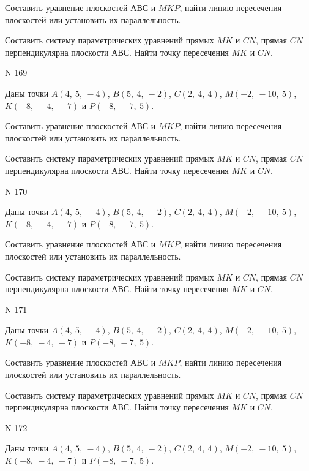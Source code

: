\documentclass[11pt]{report}
\begin{document}
Составить уравнение плоскостей $АВС$ и $MKP$,
найти линию пересечения плоскостей или установить их параллельность.

Составить систему параметрических уравнений прямых $MK$ и $CN$,
прямая $CN$ перпендикулярна плоскости $АВС$. 
Найти точку пересечения $MK$ и $CN$.



 N 169

Даны точки $A\left( 4, \  5, \  -4\right)$, $B\left( 5, \  4, \  -2\right)$, $C\left( 2, \  4, \  4\right)$, $M\left( -2, \  -10, \  5\right)$, $K\left( -8, \  -4, \  -7\right)$ и $P\left( -8, \  -7, \  5\right)$.


Составить уравнение плоскостей $АВС$ и $MKP$,
найти линию пересечения плоскостей или установить их параллельность.

Составить систему параметрических уравнений прямых $MK$ и $CN$,
прямая $CN$ перпендикулярна плоскости $АВС$. 
Найти точку пересечения $MK$ и $CN$.



 N 170

Даны точки $A\left( 4, \  5, \  -4\right)$, $B\left( 5, \  4, \  -2\right)$, $C\left( 2, \  4, \  4\right)$, $M\left( -2, \  -10, \  5\right)$, $K\left( -8, \  -4, \  -7\right)$ и $P\left( -8, \  -7, \  5\right)$.


Составить уравнение плоскостей $АВС$ и $MKP$,
найти линию пересечения плоскостей или установить их параллельность.

Составить систему параметрических уравнений прямых $MK$ и $CN$,
прямая $CN$ перпендикулярна плоскости $АВС$. 
Найти точку пересечения $MK$ и $CN$.



 N 171

Даны точки $A\left( 4, \  5, \  -4\right)$, $B\left( 5, \  4, \  -2\right)$, $C\left( 2, \  4, \  4\right)$, $M\left( -2, \  -10, \  5\right)$, $K\left( -8, \  -4, \  -7\right)$ и $P\left( -8, \  -7, \  5\right)$.


Составить уравнение плоскостей $АВС$ и $MKP$,
найти линию пересечения плоскостей или установить их параллельность.

Составить систему параметрических уравнений прямых $MK$ и $CN$,
прямая $CN$ перпендикулярна плоскости $АВС$. 
Найти точку пересечения $MK$ и $CN$.



 N 172

Даны точки $A\left( 4, \  5, \  -4\right)$, $B\left( 5, \  4, \  -2\right)$, $C\left( 2, \  4, \  4\right)$, $M\left( -2, \  -10, \  5\right)$, $K\left( -8, \  -4, \  -7\right)$ и $P\left( -8, \  -7, \  5\right)$.
\end{document}
